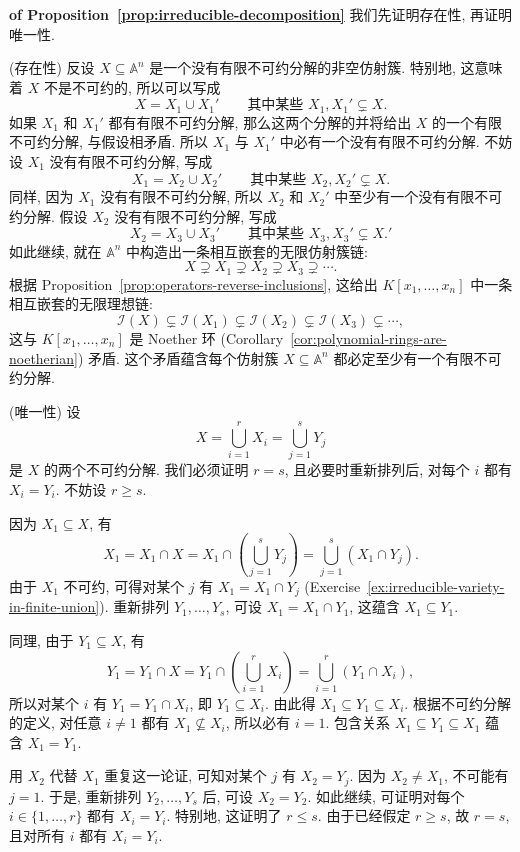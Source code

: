 \begin{Proof}\unskip\textbf{ of Proposition~\ref{prop:irreducible-decomposition}}\quad
  我们先证明存在性, 再证明唯一性.

  (存在性) 反设 $X\subseteq\mathbb{A}^{n}$ 是一个没有有限不可约分解的非空仿射簇. 特别地, 这意味着 $X$ 不是不可约的, 所以可以写成
  \[
    X=X_{1}\cup X_{1}'\qquad\text{其中某些 }X_{1},X_{1}'\subsetneq X.
  \]
  如果 $X_{1}$ 和 $X_{1}'$ 都有有限不可约分解, 那么这两个分解的并将给出 $X$ 的一个有限不可约分解, 与假设相矛盾. 所以 $X_{1}$ 与 $X_{1}'$ 中必有一个没有有限不可约分解. 不妨设 $X_{1}$ 没有有限不可约分解, 写成
  \[
    X_{1}=X_{2}\cup X_{2}'\qquad\text{其中某些 }X_{2},X_{2}'\subsetneq X.
  \]
  同样, 因为 $X_{1}$ 没有有限不可约分解, 所以 $X_{2}$ 和 $X_{2}'$ 中至少有一个没有有限不可约分解. 假设 $X_{2}$ 没有有限不可约分解, 写成
  \[
    X_{2}=X_{3}\cup X_{3}'\qquad\text{其中某些 }X_{3},X_{3}'\subsetneq X.'
  \]
  如此继续, 就在 $\mathbb{A}^{n}$ 中构造出一条相互嵌套的无限仿射簇链:
  \[
    X\supsetneq X_{1}\supsetneq X_{2}\supsetneq X_{3}\supsetneq\cdots.
  \]
  根据 Proposition~\ref{prop:operators-reverse-inclusions}, 这给出 $K[x_{1},\ldots,x_{n}]$ 中一条相互嵌套的无限理想链:
  \[
    \mathcal{I}(X)\subsetneq\mathcal{I}(X_{1})\subsetneq\mathcal{I}(X_{2})
      \subsetneq\mathcal{I}(X_{3})\subsetneq\cdots,
  \]
  这与 $K[x_{1},\ldots,x_{n}]$ 是 Noether 环 (Corollary~\ref{cor:polynomial-rings-are-noetherian}) 矛盾. 这个矛盾蕴含每个仿射簇 $X\subseteq\mathbb{A}^{n}$ 都必定至少有一个有限不可约分解.

  (唯一性) 设
  \[
    X=\bigcup_{i=1}^{r}X_{i}=\bigcup_{j=1}^{s}Y_{j}
  \]
  是 $X$ 的两个不可约分解. 我们必须证明 $r=s$, 且必要时重新排列后, 对每个 $i$ 都有 $X_{i}=Y_{i}$. 不妨设 $r\geq s$.

  因为 $X_{1}\subseteq X$, 有
  \[
    X_{1}=X_{1}\cap X=X_{1}\cap\left(\bigcup_{j=1}^{s}Y_{j}\right)
      =\bigcup_{j=1}^{s}(X_{1}\cap Y_{j}).
  \]
  由于 $X_{1}$ 不可约, 可得对某个 $j$ 有 $X_{1}=X_{1}\cap Y_{j}$ (Exercise~\ref{ex:irreducible-variety-in-finite-union}). 重新排列 $Y_{1},\ldots,Y_{s}$, 可设 $X_{1}=X_{1}\cap Y_{1}$, 这蕴含 $X_{1}\subseteq Y_{1}$.

  同理, 由于 $Y_{1}\subseteq X$, 有
  \[
    Y_{1}=Y_{1}\cap X=Y_{1}\cap\left(\bigcup_{i=1}^{r}X_{i}\right)
      =\bigcup_{i=1}^{r}(Y_{1}\cap X_{i}),
  \]
  所以对某个 $i$ 有 $Y_{1}=Y_{1}\cap X_{i}$, 即 $Y_{1}\subseteq X_{i}$. 由此得 $X_{1}\subseteq Y_{1}\subseteq X_{i}$. 根据不可约分解的定义, 对任意 $i\ne1$ 都有 $X_{1}\nsubseteq X_{i}$, 所以必有 $i=1$. 包含关系 $X_{1}\subseteq Y_{1}\subseteq X_{1}$ 蕴含 $X_{1}=Y_{1}$.

  用 $X_{2}$ 代替 $X_{1}$ 重复这一论证, 可知对某个 $j$ 有 $X_{2}=Y_{j}$. 因为 $X_{2}\ne X_{1}$, 不可能有 $j=1$. 于是, 重新排列 $Y_{2},\ldots,Y_{s}$ 后, 可设 $X_{2}=Y_{2}$. 如此继续, 可证明对每个 $i\in\{1,\ldots,r\}$ 都有 $X_{i}=Y_{i}$. 特别地, 这证明了 $r\leq s$. 由于已经假定 $r\geq s$, 故 $r=s$, 且对所有 $i$ 都有 $X_{i}=Y_{i}$.
\end{Proof}

